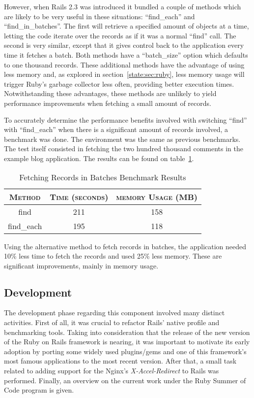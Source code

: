 However, when Rails 2.3 was introduced it bundled a couple of methods which are likely to be very useful in these situations: ``find\_each'' and ``find\_in\_batches''. The first will retrieve a specified amount of objects at a time, letting the code iterate over the records as if it was a normal ``find'' call. The second is very similar, except that it gives control back to the application every time it fetches a batch. Both methods have a ``batch\_size'' option which defaults to one thousand records. These additional methods have the advantage of using less memory and, as explored in section~\ref{state:sec:ruby}, less memory usage will trigger Ruby's garbage collector less often, providing better execution times. Notwithstanding these advantages, these methods are unlikely to yield performance improvements when fetching a small amount of records.

To accurately determine the performance benefits involved with switching ``find'' with ``find\_each'' when there is a significant amount of records involved, a benchmark was done. The environment was the same as previous benchmarks. The test itself consisted in fetching the two hundred thousand comments in the example blog application. The results can be found on table~\ref{tab:fetch_in_batches}.
\begin{table}[h!t]
  \centering
  \caption{Fetching Records in Batches Benchmark Results}
  \label{tab:fetch_in_batches}
  
  \begin{tabular}{c|c|c}
  
    \textbf{\textsc{Method}} & \textbf{\textsc{Time (seconds)}} & \textbf{\textsc{memory Usage (MB)}} \\ \hline
    find & 211 & 158 \\ \hline
    find\_each & 195 & 118 \\
  \end{tabular}
\end{table}

Using the alternative method to fetch records in batches, the application needed 10\% less time to fetch the records and used 25\% less memory. These are significant improvements, mainly in memory usage.

\subsection{Development}
The development phase regarding this component involved many distinct activities. First of all, it was crucial to refactor Rails' native profile and benchmarking tools. Taking into consideration that the release of the new version of the Ruby on Rails framework is nearing, it was important to motivate its early adoption by porting some widely used plugins/gems and one of this framework's most famous applications to the most recent version. After that, a small task related to adding support for the Nginx's \textit{X-Accel-Redirect} to Rails was performed. Finally, an overview on the current work under the Ruby Summer of Code program is given.


